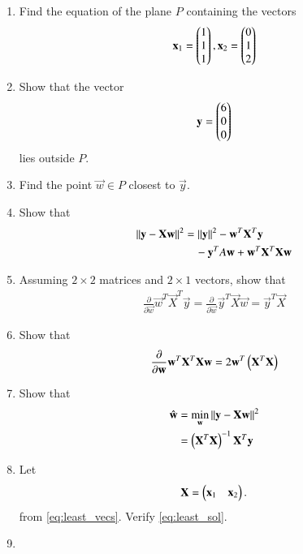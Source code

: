 \renewcommand{\theequation}{\theenumi}
\begin{enumerate}[label=\arabic*.,ref=\thesubsection.\theenumi]
\item Find the equation of the plane $P$
containing the vectors 
%
\begin{align}
\label{eq:least_vecs}
\mathbf{x}_1 = \begin{pmatrix}1 \\ 1 \\ 1\end{pmatrix}
,
\mathbf{x}_2 = \begin{pmatrix}0 \\ 1 \\ 2\end{pmatrix}
\end{align}
%
\item Show that the vector 
\begin{align}
\mathbf{y} = \begin{pmatrix}6 \\ 0 \\ 0\end{pmatrix}
\end{align}
lies outside $P$.
\item Find the point $\vec{w} \in P$ closest to $\vec{y}$.
\item Show that
\begin{align}
\left\lVert\mathbf{y}-\mathbf{X}\mathbf{w}\right\rVert^2 &= \left\lVert\mathbf{y}\right\rVert^2 - \mathbf{w}^T\mathbf{X}^T\mathbf{y} 
\\
& \quad - \mathbf{y}^TA\mathbf{w}+\mathbf{w}^T\mathbf{X}^T\mathbf{X}\mathbf{w}
\end{align}
%
\item Assuming $2\times 2$ matrices and $2 \times 1$ vectors, show that
\begin{align}
\frac{\partial}{\partial\vec{w}}\vec{w}^T\vec{X}^T\vec{y} = \frac{\partial}{\partial\vec{w}}\vec{y}^T\vec{X}\vec{w} = 
\vec{y}^T\vec{X}
\end{align}
\item Show that
\begin{align}
\frac{\partial}{\partial\mathbf{w}}\mathbf{w}^T\mathbf{X}^T\mathbf{X}\mathbf{w} = 2\mathbf{w}^T\left(\mathbf{X}^T\mathbf{X}\right)
\end{align}
\item Show that 
\begin{align}
\hat{\mathbf{w}} &= \min_{\mathbf{w}}\left\lVert\mathbf{y}-\mathbf{X}\mathbf{w}\right\rVert^2
\\
 &= \left(\mathbf{X}^T\mathbf{X}\right)^{-1}\mathbf{X}^T \mathbf{y}
\label{eq:least_sol}
\end{align}
\item Let 
\begin{align}
\mathbf{X} = \begin{pmatrix}\mathbf{x}_1 & \mathbf{x}_2\end{pmatrix}.
\end{align}
from \eqref{eq:least_vecs}.
Verify \eqref{eq:least_sol}.
\item

\end{enumerate}
